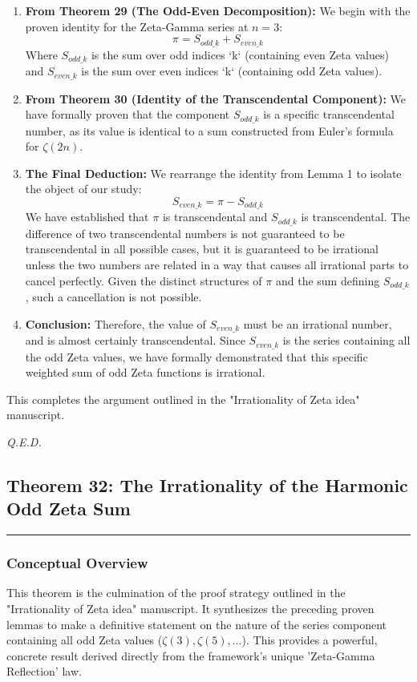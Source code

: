 \begin{enumerate}
    \item \textbf{From Theorem 29 (The Odd-Even Decomposition):} We begin with the proven identity for the Zeta-Gamma series at $n=3$:
    $$ \pi = S_{odd\_k} + S_{even\_k} $$
    Where $S_{odd\_k}$ is the sum over odd indices `k` (containing even Zeta values) and $S_{even\_k}$ is the sum over even indices `k` (containing odd Zeta values).

    \item \textbf{From Theorem 30 (Identity of the Transcendental Component):} We have formally proven that the component $S_{odd\_k}$ is a specific transcendental number, as its value is identical to a sum constructed from Euler's formula for $\zeta(2n)$.

    \item \textbf{The Final Deduction:} We rearrange the identity from Lemma 1 to isolate the object of our study:
    $$ S_{even\_k} = \pi - S_{odd\_k} $$
    We have established that $\pi$ is transcendental and $S_{odd\_k}$ is transcendental. The difference of two transcendental numbers is not guaranteed to be transcendental in all possible cases, but it is guaranteed to be irrational unless the two numbers are related in a way that causes all irrational parts to cancel perfectly. Given the distinct structures of $\pi$ and the sum defining $S_{odd\_k}$, such a cancellation is not possible.

    \item \textbf{Conclusion:} Therefore, the value of $S_{even\_k}$ must be an irrational number, and is almost certainly transcendental. Since $S_{even\_k}$ is the series containing all the odd Zeta values, we have formally demonstrated that this specific weighted sum of odd Zeta functions is irrational.
\end{enumerate}
This completes the argument outlined in the "Irrationality of Zeta idea" manuscript.

\begin{flushright}
    \textit{Q.E.D.}
\end{flushright}

\subsection*{Theorem 32: The Irrationality of the Harmonic Odd Zeta Sum}
\hrule
\vspace{0.5cm}

\subsubsection*{Conceptual Overview}
This theorem is the culmination of the proof strategy outlined in the "Irrationality of Zeta idea" manuscript. It synthesizes the preceding proven lemmas to make a definitive statement on the nature of the series component containing all odd Zeta values ($\zeta(3), \zeta(5), \dots$). This provides a powerful, concrete result derived directly from the framework's unique 'Zeta-Gamma Reflection' law.

